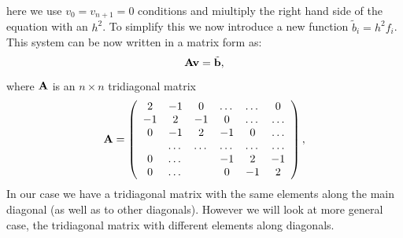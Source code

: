 \documentclass[10pt]{article}
\begin{document}
here we use $v_0 = v_{n+1} = 0$ conditions and miultiply the right hand side of the equation with an $ h^2 $. To simplify this we now introduce a new function $\tilde{b}_i=h^2f_i$. This system can be now written in a matrix form as:
\begin{equation}\label{equ:three}
   {\bf A}{\bf v} = \tilde{{\bf b}},
\end{equation}
where ${\bf A}$ is an $n\times n$  tridiagonal matrix  
\begin{equation}
    {\bf A} = \left(\begin{array}{cccccc}
                           2& -1& 0 &\dots   & \dots &0 \\
                           -1 & 2 & -1 &0 &\dots &\dots \\
                           0&-1 &2 & -1 & 0 & \dots \\
                           & \dots   & \dots &\dots   &\dots & \dots \\
                           0&\dots   &  &-1 &2& -1 \\
                           0&\dots    &  & 0  &-1 & 2 \\
                      \end{array} \right),
\end{equation}
In our case we have a tridiagonal matrix with the same elements along the main diagonal (as well as to other diagonals). However we will look at more general case, the tridiagonal matrix with different elements along diagonals. 
\end{document}
